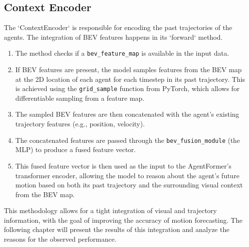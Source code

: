 \subsection{Context Encoder}

The `ContextEncoder` is responsible for encoding the past trajectories of the agents. The integration of BEV features happens in its `forward` method.

\begin{enumerate}
    \item The method checks if a {\sloppy\texttt{bev\_feature\_map}} is available in the input data.
    \item If BEV features are present, the model samples features from the BEV map at the 2D location of each agent for each timestep in its past trajectory. This is achieved using the {\sloppy\texttt{grid\_sample}} function from PyTorch, which allows for differentiable sampling from a feature map.
    \item The sampled BEV features are then concatenated with the agent's existing trajectory features (e.g., position, velocity).
    \item The concatenated features are passed through the \texttt{bev\_fusion\_module} (the MLP) to produce a fused feature vector.
    \item This fused feature vector is then used as the input to the AgentFormer's transformer encoder, allowing the model to reason about the agent's future motion based on both its past trajectory and the surrounding visual context from the BEV map.
\end{enumerate}

This methodology allows for a tight integration of visual and trajectory information, with the goal of improving the accuracy of motion forecasting. The following chapter will present the results of this integration and analyze the reasons for the observed performance.
